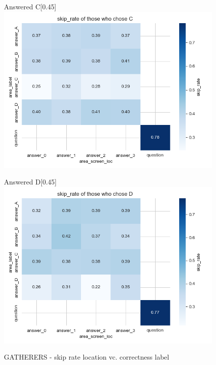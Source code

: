 \documentclass{article}
\begin{document}
\begin{figure}[H]
  \vspace{1em} %

  \begin{subcaptionbox}{Answered C\label{fig:C_sr_g}}[0.45\textwidth]
    {\centering\includegraphics[width=\linewidth]{plots/matrix_plots/matrix_skip_rate_C_gatherers.png}}
  \end{subcaptionbox}
  \hfill
  \begin{subcaptionbox}{Answered D\label{fig:D_sr_g}}[0.45\textwidth]
    {\centering\includegraphics[width=\linewidth]{plots/matrix_plots/matrix_skip_rate_D_gatherers.png}}
  \end{subcaptionbox}
  
  \caption{GATHERERS - skip rate location vc. correctness label}
  \label{fig:fourimages10}
\end{figure}
\end{document}
